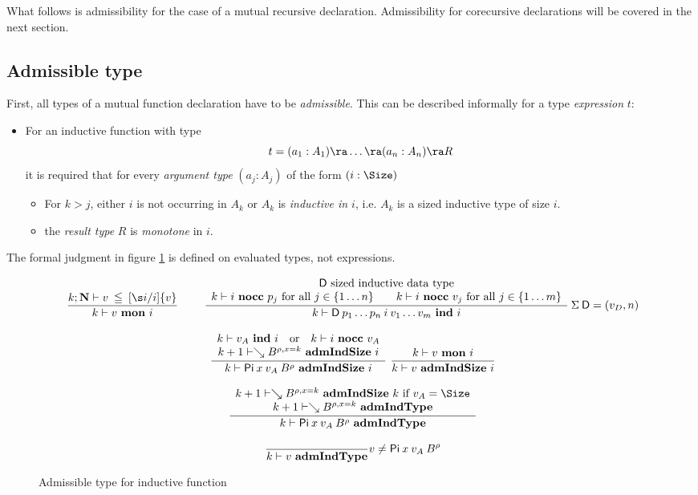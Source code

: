 \newcommand{\mon}[3]{#1\vdash#2\mbox{ \textbf{mon} }#3}
\newcommand{\indu}[3]{#1\vdash#2\mbox{ \textbf{ind} }#3}
\newcommand{\coind}[3]{#1\vdash#2\mbox{ \textbf{coind} }#3}
\newcommand{\admIndSize}[3]{#1\vdash#2\mbox{ \textbf{admIndSize} }#3}
\newcommand{\admCoSize}[3]{#1\vdash#2\mbox{ \textbf{admCoSize} }#3}
\newcommand{\admIndType}[2]{#1\vdash#2\mbox{ \textbf{admIndType}}}
\newcommand{\admCoType}[2]{#1\vdash#2\mbox{ \textbf{admCoType}}}

\newcommand{\sizePat}[1]{\vdash#1\mbox{ \textbf{sizePat}}}
\newcommand{\sizePats}[1]{\vdash#1\mbox{ \textbf{sizePats}}}

What follows is admissibility for the case of a mutual recursive declaration.
Admissibility for corecursive declarations will be covered in the next section.
\subsection{Admissible type}

First, all types of a mutual function declaration have to be \emph{admissible}.
This can be described informally for a type \emph{expression} $t$:
\begin{itemize}
\item
For an inductive function with type \[t = (a_1 : A_1) \ra \ldots \ra (a_n : A_n) \ra R\]
it is required that for every \emph{argument type} $(a_j : A_j)$ of the form $(i : \Size)$  
\begin{itemize}
\item
For $k>j$, either $i$ is not occurring in $A_k$ or $A_k$ is \emph{inductive in $i$}, i.e. $A_k$ is a sized inductive type of size $i$.
\item
the \emph{result type} $R$ is \emph{monotone} in $i$. 
\end{itemize}
\end{itemize}
The formal judgment in figure \ref{admi} is defined on evaluated types, not expressions.

\begin{figure}[htp]
\begin{gather*}
\nru{}
{\LeqVal{k}{\nF}{v}{\subst{[\s i/i]}{v}}}
{\mon{k}{v}{i}}
\qquad
\ndru{}
{\DD \mbox{ sized inductive data type}}
{\nocc{k}{i}{p_j} \mbox{ for all } j \in \{1\ldots n\} \qquad \nocc{k}{i}{v_j} \mbox{ for all } j \in \{1\ldots m\}}
{\indu{k}{\DD \: p_1 \ldots p_n \: i \: v_1 \ldots v_m}{i}}
{\: \Sig \: \DD = (v_D,n)}
\\[2ex]
\ndru{}
{\indu{k}{v_A}{i} \quad \mbox{or} \quad \nocc{k}{i}{v_A}}
{\admIndSize{k+1}{\wh \cl{B}{\ins{\rho}{x}{k}}}{i}}
{\admIndSize{k}{\vpi \: x \: v_A \: \cl{B}{\rho}}{i}}
\nru{}
{\mon{k}{v}{i}}
{\admIndSize{k}{v}{i}}
\\[2ex]
\ndru{}
{\admIndSize{k+1}{\wh \cl{B}{\ins{\rho}{x}{k}}}{k} \mbox{ if } v_A = \Size}
{\admIndType{k+1}{\wh \cl{B}{\ins{\rho}{x}{k}}}}
{\admIndType{k}{\vpi \: x \: v_A \: \cl{B}{\rho}}}
\\[2ex]
\nru{}
{}
{\admIndType{k}{v}}
v \neq \vpi \: x \: v_A \: \cl{B}{\rho}
\end{gather*}
\caption{Admissible type for inductive function}
\label{admi}
\end{figure}

